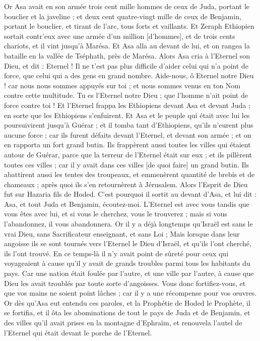 \begin{multicols}{2}
Or Asa avait en son armée trois cent mille hommes de ceux de Juda, portant le bouclier et la javeline ; et deux cent quatre-vingt mille de ceux de Benjamin, portant le bouclier, et tirant de l'arc, tous forts et vaillants.
Et Zeraph Ethiopien sortait contr'eux avec une armée d'un million [d'hommes], et de trois cents chariots, et il vint jusqu'à Marésa.
Et Asa alla au devant de lui, et on rangea la bataille en la vallée de Tséphath, près de Marésa.
Alors Asa cria à l'Eternel son Dieu, et dit : Eternel ! Il ne t'est pas plus difficile d'aider celui qui n'a point de force, que celui qui a des gens en grand nombre. Aide-nous, ô Eternel notre Dieu ! car nous nous sommes appuyés sur toi ; et nous sommes venus en ton Nom contre cette multitude. Tu es l'Eternel notre Dieu ; que l'homme n'ait point de force contre toi !
Et l'Eternel frappa les Ethiopiens devant Asa et devant Juda ; en sorte que les Ethiopiens s'enfuirent.
Et Asa et le peuple qui était avec lui les poursuivirent jusqu'à Guérar ; et il tomba tant d'Ethiopiens, qu'ils n'eurent plus aucune force ; car ils furent défaits devant l'Eternel, et devant son armée ; et on en rapporta un fort grand butin.
Ils frappèrent aussi toutes les villes qui étaient autour de Guérar, parce que la terreur de l'Eternel était sur eux ; et ils pillèrent toutes ces villes ; car il y avait dans ces villes [de quoi faire] un grand butin.
Ils abattirent aussi les tentes des troupeaux, et emmenèrent quantité de brebis et de chameaux ; après quoi ils s'en retournèrent à Jérusalem.
\VerseOne{}Alors l'Esprit de Dieu fut sur Hazaria fils de Hoded.
C'est pourquoi il sortit au devant d'Asa, et lui dit : Asa, et tout Juda et Benjamin, écoutez-moi. L'Eternel est avec vous tandis que vous êtes avec lui, et si vous le cherchez, vous le trouverez ; mais si vous l'abandonnez, il vous abandonnera.
Or il y a déjà longtemps qu'Israël est sans le vrai Dieu, sans Sacrificateur enseignant, et sans Loi ;
Mais lorsque dans leur angoisse ils se sont tournés vers l'Eternel le Dieu d'Israël, et qu'ils l'ont cherché, ils l'ont trouvé.
En ce temps-là il n'y avait point de sûreté pour ceux qui voyageaient à cause qu'il y avait de grands troubles parmi tous les habitants du pays.
Car une nation était foulée par l'autre, et une ville par l'autre, à cause que Dieu les avait troublés par toute sorte d'angoisses.
Vous donc fortifiez-vous, et que vos mains ne soient point lâches ; car il y a une récompense pour vos œuvres.
Or dès qu'Asa eut entendu ces paroles, et la Prophétie de Hoded le Prophète, il se fortifia, et il ôta les abominations de tout le pays de Juda et de Benjamin, et des villes qu'il avait prises en la montagne d'Ephraïm, et renouvela l'autel de l'Eternel qui était devant le porche de l'Eternel.

\end{multicols}
